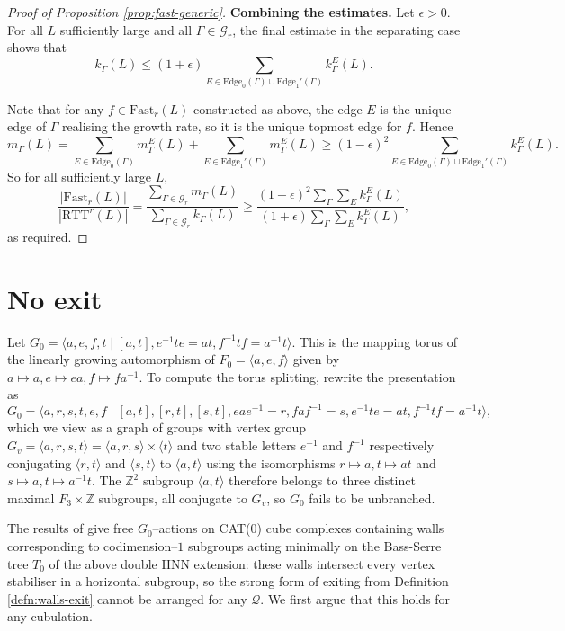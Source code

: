 \documentclass[11pt,oneside]{amsart}
\newcounter{ax}
\theoremstyle{definition}
\newcommand{\field}[1]{\mathbb{#1}}
\newcommand{\integers}{\ensuremath{\field{Z}}}
\newcommand{\edges}{\mathrm{Edge}}
\newcommand{\ttm}{\mathrm{RTT}}
\newcommand{\Fast}{\mathrm{Fast}}
\begin{document}
\begin{proof}[Proof of Proposition \ref{prop:fast-generic}]
\textbf{Combining the estimates.}  Let $\epsilon>0$.  For all  $L$ sufficiently large and all $\Gamma\in\mathcal G_r$, the final estimate in the separating case shows that
$$k_\Gamma(L)\leq (1+\epsilon)\sum_{E\in\edges_0(\Gamma)\cup \edges_1'(\Gamma)}k^E_\Gamma(L).$$

Note that for any $f\in\Fast_r(L)$ constructed as above, the edge $E$ is the unique edge of $\Gamma$ realising the growth rate, so it is the unique topmost edge for $f$.   Hence
$$m_\Gamma(L)=\sum_{E\in\edges_0(\Gamma)}m^E_\Gamma(L)+\sum_{E\in\edges_1'(\Gamma)}m^E_\Gamma(L)\geq (1-\epsilon)^2\sum_{E\in\edges_0(\Gamma)\cup\edges_1'(\Gamma)}k_\Gamma^E(L).$$
So for all sufficiently large $L$, 
$$\frac{|\Fast_r(L)|}{|\ttm^r(L)|}=\frac{\sum_{\Gamma\in\mathcal G_r}m_\Gamma(L)}{\sum_{\Gamma\in\mathcal G_r}k_\Gamma(L)}\geq \frac{(1-\epsilon)^2\sum_\Gamma \sum_E k_\Gamma^E(L)}{(1+\epsilon)\sum_\Gamma\sum_E k_\Gamma^E(L)},$$
as required.
\end{proof}


\section{No exit}\label{subsec:intro-counterexample-question}
Let $G_0=\langle a,e,f,t\mid[a,t], e^{-1}te=at,f^{-1}tf=a^{-1}t\rangle.$
This is the mapping torus of the linearly growing automorphism of $F_0=\langle a,e,f\rangle$ given by $a\mapsto a,e\mapsto ea,f\mapsto fa^{-1}$.  To compute the torus splitting, rewrite the presentation as 
$$G_0=\langle a,r,s,t,e,f\mid[a,t],[r,t],[s,t], eae^{-1}=r,faf^{-1}=s,e^{-1}te=at,f^{-1}tf=a^{-1}t\rangle,$$
which we view as a graph of groups with vertex group $G_v=\langle a,r,s,t\rangle=\langle a,r,s\rangle\times\langle t\rangle$ and two stable letters $e^{-1}$ and $f^{-1}$ respectively conjugating $\langle r,t\rangle$ and $\langle s,t\rangle$ to $\langle a,t\rangle$ using the isomorphisms $r\mapsto a,t\mapsto at$ and $s\mapsto a,t\mapsto a^{-1}t$.  The $\integers^2$ subgroup $\langle a,t\rangle$ therefore belongs to three distinct maximal $F_3\times\integers$ subgroups, all conjugate to $G_v$, so $G_0$ fails to be unbranched.

The results of \cite{Wise:tubular} give free $G_0$--actions on CAT(0) cube complexes containing walls corresponding to codimension--$1$ subgroups acting minimally on the Bass-Serre tree $T_0$ of the above double HNN extension: these walls intersect every vertex stabiliser in a horizontal subgroup, so the strong form of exiting from Definition \ref{defn:walls-exit} cannot be arranged for any $\mathcal Q$.  We first argue that this holds for any cubulation.
\end{document}
